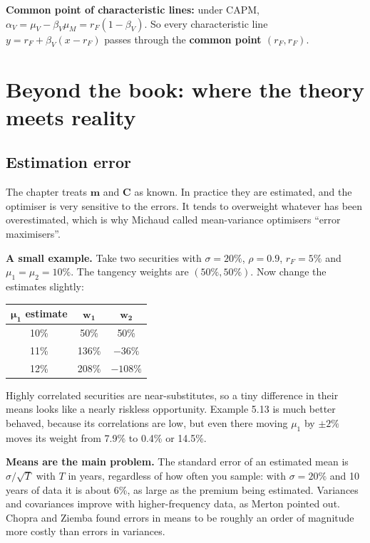 \documentclass[titlepage,11pt,a4paper]{article}
\newcommand{\vm}{\boldsymbol{m}}
\newcommand{\vC}{\boldsymbol{C}}
\begin{document}
\textbf{Common point of characteristic lines:} under CAPM, $\alpha_V=\mu_V-\beta_V\mu_M=r_F(1-\beta_V)$. So every characteristic line $y=r_F+\beta_V(x-r_F)$ passes through the \textbf{common point $(r_F,r_F)$}.

\section{Beyond the book: where the theory meets reality}

\subsection{Estimation error}
The chapter treats $\vm$ and $\vC$ as known. In practice they are estimated, and the optimiser is very sensitive to the errors. It tends to overweight whatever has been overestimated, which is why Michaud called mean-variance optimisers ``error maximisers''.

\textbf{A small example.} Take two securities with $\sigma=20\%$, $\rho=0.9$, $r_F=5\%$ and $\mu_1=\mu_2=10\%$. The tangency weights are $(50\%,50\%)$. Now change the estimates slightly:

\begin{center}\renewcommand{\arraystretch}{1.2}
\begin{tabular}{ccc}
\toprule
\textbf{$\boldsymbol{\mu_1}$ estimate} & $\boldsymbol{w_1}$ & $\boldsymbol{w_2}$\\
\midrule
10\% & 50\% & 50\%\\
11\% & 136\% & $-36\%$\\
12\% & 208\% & $-108\%$\\
\bottomrule
\end{tabular}
\end{center}

Highly correlated securities are near-substitutes, so a tiny difference in their means looks like a nearly riskless opportunity. Example 5.13 is much better behaved, because its correlations are low, but even there moving $\mu_1$ by $\pm2\%$ moves its weight from 7.9\% to 0.4\% or 14.5\%.

\textbf{Means are the main problem.} The standard error of an estimated mean is $\sigma/\sqrt{T}$ with $T$ in years, regardless of how often you sample: with $\sigma=20\%$ and 10 years of data it is about 6\%, as large as the premium being estimated. Variances and covariances improve with higher-frequency data, as Merton pointed out. Chopra and Ziemba found errors in means to be roughly an order of magnitude more costly than errors in variances.
\end{document}
